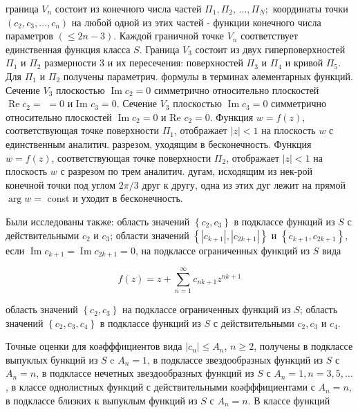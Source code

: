 \documentclass[10pt]{article}
\begin{document}
граница $V_{n}$ состоит из конечного числа частей $\Pi_{1}, \Pi_{2}$, $\ldots, \Pi_{N} ;$ координаты точки $\left(c_{2}, c_{3}, \ldots, c_{n}\right)$ на любой одной из этих частей - функции конечного числа параметров $(\leqslant 2 n-3)$. Каждой граничной точке $V_{n}$ соответствует единственная функция класса $S$. Граница $V_{3}$ состоит из двух гиперповерхностей $\Pi_{1}$ и $\Pi_{2}$ размерности 3 и их пересечения: поверхностей $\Pi_{3}$ и $\Pi_{4}$ и кривой $\Pi_{5}$. Для $\Pi_{1}$ и $\Pi_{2}$ получены параметрич. формулы в терминах әлементарных функций. Сечение $V_{3}$ плоскостью $\operatorname{Im} c_{2}=0$ симметрично относительно плоскостей $\operatorname{Re} c_{2}=$ $=0$ и Im $c_{3}=0$. Сечение $V_{3}$ плоскостью $\operatorname{Im} c_{3}=0$ симметрично относительно плоскостей $\operatorname{Im} c_{2}=0$ и Re $c_{2}=0$. Функция $w=f(z)$, соответствующая точке поверхности $\Pi_{1}$, отображает $|z|<1$ на плоскость $w$ с единственным аналитич. разрезом, уходящим в бесконечность. Функция $w=f(z)$, соответствующая точке поверхности $\Pi_{2}$, отображает $|z|<1$ на плоскость $w$ с разрезом по трем аналитич. дугам, исходящим из нек-рой конечной точки под углом $2 \pi / 3$ друг к другу, одна из этих дуг лежит на прямой $\arg w=$ const и уходит в бесконечность.



Были исследованы также: область значений $\left\{c_{2}, c_{3}\right\}$ в подклассе функций из $S$ с действительными $c_{2}$ и $c_{3}$; области значений $\left\{\left|c_{k+1}\right|,\left|c_{2 k+1}\right|\right\}$ и $\left\{c_{k+1}, c_{2 k+1}\right\}$, если $\operatorname{Im} c_{k+1}=\operatorname{Im} c_{2 k+1}=0$, на подклассе ограниченных функций из $S$ вида



\[

f(z)=z+\sum_{n=1}^{\infty} c_{n k+1} z^{n k+1}

\]



область значений $\left\{c_{2}, c_{3}\right\}$ на подклассе ограниченных функций из $S$; область значений $\left\{c_{2}, c_{3}, c_{4}\right\}$ в подклассе функций из $S$ с действительными $c_{2}, c_{3}$ и $c_{4}$.



Точные оценки для коәфффициентов вида $\left|c_{n}\right| \leqslant A_{n}$, $n \geqslant 2$, получены в подклассе выпуклых бункций из $S$ c $A_{n}=1$, в подклассе звездообразных функций из $S$ с $A_{n}=n$, в подклассе нечетных звездообразных функций из $S$ с $A_{n}=1, n=3,5, \ldots$, в классе однолистных функций с действительными коәфффициентами с $A_{n}=n$, в подклассе близких к выпуклым функций из $S$ с $A_{n}=n$. В классе функций
\end{document}
